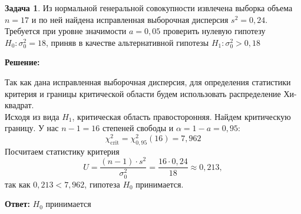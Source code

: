 \documentclass[a4paper,11pt]{article}
\newenvironment{shdd}{\begin{mdframed}[backgroundcolor=shadecolor]}{\end{mdframed}}
\theoremstyle{definition}
\newtheorem{problem}{Задача}\setlength{\parindent}{0pt}
\newenvironment{solution}
{\begin{shdd}
     \textbf{Решение:}\par\setlength{\parindent}{0pt}}
     {
\end{shdd}}
\newenvironment{answer}
{\par\noindent\textbf{Ответ:}}
{\par}
\begin{document}
    \vspace{10pt}
    \begin{problem}
        Из нормальной генеральной совокупности извлечена выборка объема \(n=17\) и по ней
        найдена исправленная выборочная дисперсия \(s^2 = 0,24\).
        \\
    
        Требуется при уровне значимости \(a = 0,05\) проверить нулевую гипотезу \(H_0: \sigma_0^2 = 18\),
        приняв в качестве альтернативной гипотезы \(H_1: \sigma_0^2 > 0,18\)

        \begin{solution}
            Так как дана исправленная выборочная дисперсия, для определения статистики критерия
            и границы критической области будем использовать распределение Хи-квадрат.
            \\
        
            Исходя из вида \(H_1\), критическая область правосторонняя.
            Найдем критическую границу. У нас \(n - 1 = 16\) степеней свободы и \( \alpha = 1 - a = 0,95 \):
            \[
                \chi^2_{\text{crit}} = \chi^2_{0,95}(16) = 7,962
            \]
            Посчитаем статистику критерия
            \[
                U = \frac{(n-1)\cdot s^2}{\sigma_0^2} = \frac{16 \cdot 0,24}{18} \approx 0,213,
            \]
            так как \(0,213 < 7,962\), гипотеза \(H_0\) принимается.
        \end{solution}

        \begin{answer}
            \(H_0\) принимается
        \end{answer}


    \end{problem}
\end{document}
